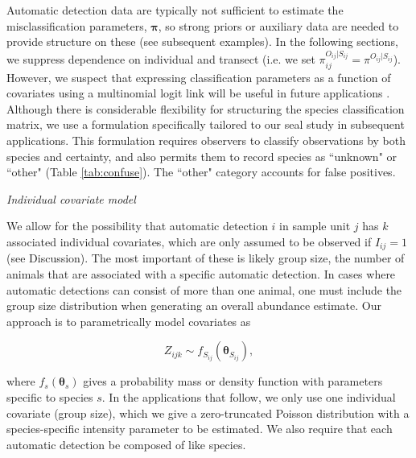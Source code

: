 \documentclass[12pt,fleqn]{article}
\begin{document}
\begin{flushleft}
\hspace{.5in}Automatic detection data are typically not sufficient to estimate the misclassification parameters, $\boldsymbol{\pi}$, so strong priors or auxiliary data are needed to provide structure on these (see subsequent examples).  In the following sections, we suppress dependence on individual and transect (i.e. we set $\pi_{ij}^{O_{ij}|S_{ij}}=\pi^{O_{ij}|S_{ij}}$).  However, we suspect that expressing classification parameters as a function of covariates using a multinomial logit link \citep{Agresti2002} will be useful in future applications \citep[see e.g.][for further discussion]{ConnEtAl2013}.  Although there is considerable flexibility for structuring the species classification matrix, we use a formulation specifically tailored to our seal study in subsequent applications.  This formulation requires observers to classify observations by both species and certainty, and also permits them to record species as ``unknown" or ``other" (Table \ref{tab:confuse}).  The ``other" category accounts for false positives.

\vspace{.15in}
{\it Individual covariate model} \\
\vspace{.15in}

\hspace{.5in}We allow for the possibility that automatic detection $i$ in sample unit $j$ has $k$ associated individual covariates, which are only assumed to be observed if $I_{ij}=1$ (see Discussion).  The most important of these
is likely group size, the number of animals that are associated with a specific automatic detection.  In cases where automatic detections can consist of more than one animal, one must include the group size distribution when generating an overall abundance estimate.  Our approach is to parametrically
model covariates as
\begin{linenomath*}
\begin{equation*}
  Z_{ijk} \sim f_{S_{ij}}(\boldsymbol{\theta}_{S_{ij}}),
\end{equation*}
\end{linenomath*}
where $f_s(\boldsymbol{\theta}_s)$ gives a probability mass or density function with parameters specific to species $s$.  In the applications that follow, we only use one individual covariate (group size), which we give a zero-truncated Poisson distribution with a species-specific intensity parameter to be estimated.  We also require that each
automatic detection be composed of like species.


\end{flushleft}
\end{document}
